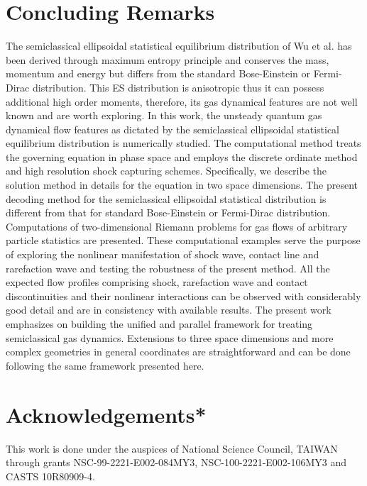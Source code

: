 \documentclass{rsproca}%
\begin{document}
\section{Concluding Remarks}
\label{remarks}
The semiclassical ellipsoidal statistical equilibrium distribution of Wu et al. \cite{Wu2012} has been derived through maximum entropy principle and conserves the mass, momentum and energy but differs from the standard Bose-Einstein or Fermi-Dirac distribution.  This ES distribution is anisotropic thus it can possess additional high order moments, therefore, its gas dynamical features are not well known and are worth exploring.   In this work, the unsteady quantum gas dynamical flow features as dictated by the semiclassical ellipsoidal statistical equilibrium distribution is numerically studied.   The computational method treats the governing equation in phase space and employs the discrete ordinate method and high resolution shock capturing schemes.  Specifically, we describe the solution method in details for the equation in two space dimensions.   The present decoding method for the semiclassical ellipsoidal statistical distribution is different from that for standard Bose-Einstein or Fermi-Dirac distribution.   Computations of two-dimensional Riemann problems for gas flows of arbitrary particle statistics are presented.  These computational examples serve the purpose of exploring the nonlinear manifestation of shock wave, contact line and rarefaction wave and testing the robustness of the present method.   All the expected flow profiles comprising shock, rarefaction wave and contact discontinuities and their nonlinear interactions can be observed with considerably good detail and are in consistency with available results.   The present work emphasizes on building the unified and parallel framework for treating semiclassical gas dynamics.   Extensions to three space dimensions and more complex geometries in general coordinates are straightforward and can be done following the same framework presented here.


\section{Acknowledgements*}
\label{Acknowledgements}
This work is done under the auspices of National Science Council, TAIWAN through grants NSC-99-2221-E002-084MY3, NSC-100-2221-E002-106MY3 and CASTS 10R80909-4.






\end{document}

